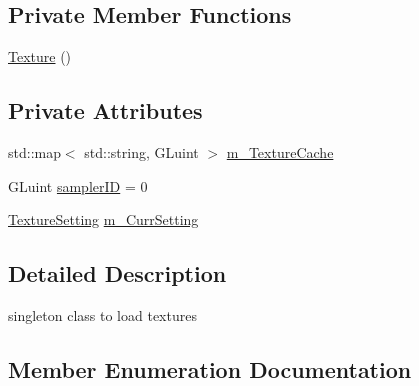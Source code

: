 \subsection*{Private Member Functions}
\begin{DoxyCompactItemize}
\item 
\hyperlink{class_face3_d_1_1_texture_af22c3684f7cef6023862f61cab25bb98}{Texture} ()
\end{DoxyCompactItemize}
\subsection*{Private Attributes}
\begin{DoxyCompactItemize}
\item 
std\+::map$<$ std\+::string, G\+Luint $>$ \hyperlink{class_face3_d_1_1_texture_a12f88846d60462abc4898b0a9cc54bf9}{m\+\_\+\+Texture\+Cache}
\item 
G\+Luint \hyperlink{class_face3_d_1_1_texture_a4d9b0c399e52a64c72f096ffb768e6e7}{sampler\+ID} = 0
\item 
\hyperlink{class_face3_d_1_1_texture_aa2d0d0213ac74b112ce13cf5511a0573}{Texture\+Setting} \hyperlink{class_face3_d_1_1_texture_ab3ef103303845ee062b3c2d0618d6c32}{m\+\_\+\+Curr\+Setting}
\end{DoxyCompactItemize}


\subsection{Detailed Description}
singleton class to load textures 

\subsection{Member Enumeration Documentation}
